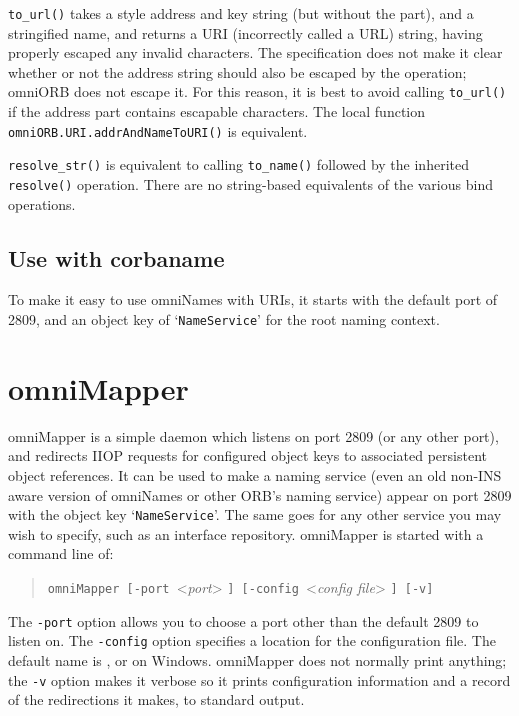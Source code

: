 \documentclass[11pt,oneside,a4paper]{book}
\newcommand{\op}[1]{\texttt{#1()}}
\newcommand{\cmdline}[1]{\texttt{#1}}
\begin{document}
\op{to\_url} takes a  style address and key string
(but without the  part), and a stringified name,
and returns a  URI (incorrectly called a URL)
string, having properly escaped any invalid characters. The
specification does not make it clear whether or not the address string
should also be escaped by the operation; omniORB does not escape
it. For this reason, it is best to avoid calling \op{to\_url} if the
address part contains escapable characters.  The local function
\op{omniORB.URI.addrAndNameToURI} is equivalent.

\op{resolve\_str} is equivalent to calling \op{to\_name} followed by
the inherited \op{resolve} operation. There are no string-based
equivalents of the various bind operations.


\subsection{Use with corbaname}

To make it easy to use omniNames with  URIs, it
starts with the default port of 2809, and an object key of
`\texttt{NameService}' for the root naming context.


\section{omniMapper}

omniMapper is a simple daemon which listens on port 2809 (or any other
port), and redirects IIOP requests for configured object keys to
associated persistent object references. It can be used to make a
naming service (even an old non-INS aware version of omniNames or
other ORB's naming service) appear on port 2809 with the object key
`\texttt{NameService}'. The same goes for any other service you may
wish to specify, such as an interface repository. omniMapper is
started with a command line of:

\begin{quote}
\cmdline{omniMapper [-port }<\textit{port}>%
\cmdline{] [-config }<\textit{config file}>%
\cmdline{] [-v]}
\end{quote}

\noindent The \cmdline{-port} option allows you to choose a port other
than the default 2809 to listen on. The \cmdline{-config} option
specifies a location for the configuration file. The default name is
, or  on
Windows. omniMapper does not normally print anything; the \cmdline{-v}
option makes it verbose so it prints configuration information and a
record of the redirections it makes, to standard output.
\end{document}
